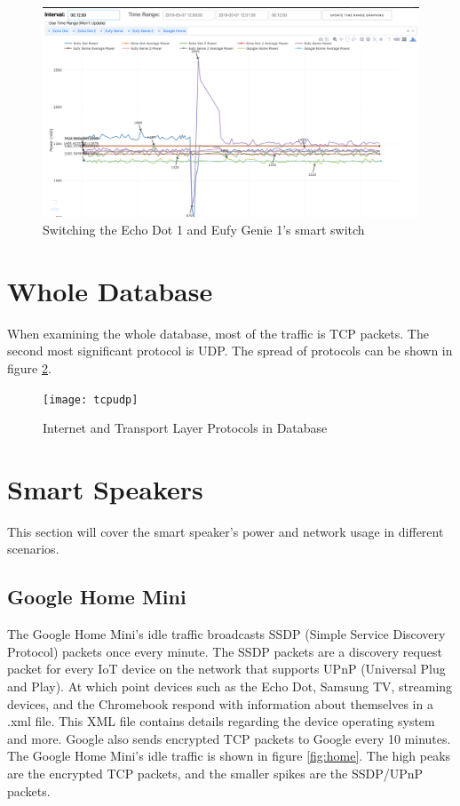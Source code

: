 \begin{figure}[H]
    \centering
    \includegraphics[width=1\textwidth]{figures/switchEchoEufyPlug.png}
    \caption{Switching the Echo Dot 1 and Eufy Genie 1's smart switch}
    \label{fig:switchEchoEufyPlug}
\end{figure}

\section{Whole Database}
\label{wholeDB}
When examining the whole database, most of the traffic is TCP packets. The second most significant protocol is UDP. The spread of protocols can be shown in figure \ref{fig:tcpudp}.

\label{Whole Database}
\begin{figure}[H]
  \centering
    \texttt{[image: tcpudp]}
  \caption{Internet and Transport Layer Protocols in Database}
  \label{fig:tcpudp}
\end{figure}

\section{Smart Speakers}
\label{smartSpeakerResults}
This section will cover the smart speaker's power and network usage in different scenarios.

\subsection{Google Home Mini}
The Google Home Mini's idle traffic broadcasts SSDP (Simple Service Discovery Protocol) packets once every minute. The SSDP packets are a discovery request packet for every IoT device on the network that supports UPnP (Universal Plug and Play). At which point devices such as the Echo Dot, Samsung TV, streaming devices, and the Chromebook respond with information about themselves in a .xml file. This XML file contains details regarding the device operating system and more. Google also sends encrypted TCP packets to Google every 10 minutes. The Google Home Mini's idle traffic is shown in figure \ref{fig:home}. The high peaks are the encrypted TCP packets, and the smaller spikes are the SSDP/UPnP packets.

